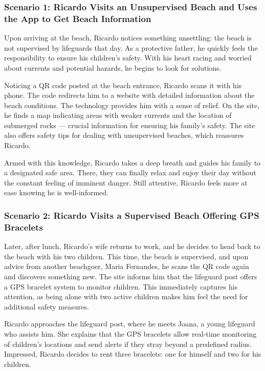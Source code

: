 \subsubsection{\textbf{Scenario 1:} Ricardo Visits an Unsupervised Beach and Uses the App to Get Beach Information}
Upon arriving at the beach, Ricardo notices something unsettling: the beach is not supervised by lifeguards that day. As a protective father, he quickly feels the responsibility to ensure his children’s safety. With his heart racing and worried about currents and potential hazards, he begins to look for solutions.

Noticing a QR code posted at the beach entrance, Ricardo scans it with his phone. The code redirects him to a website with detailed information about the beach conditions. The technology provides him with a sense of relief. On the site, he finds a map indicating areas with weaker currents and the location of submerged rocks — crucial information for ensuring his family’s safety. The site also offers safety tips for dealing with unsupervised beaches, which reassures Ricardo.

Armed with this knowledge, Ricardo takes a deep breath and guides his family to a designated safe area. There, they can finally relax and enjoy their day without the constant feeling of imminent danger. Still attentive, Ricardo feels more at ease knowing he is well-informed.

\subsubsection{\textbf{Scenario 2:} Ricardo Visits a Supervised Beach Offering GPS Bracelets}
Later, after lunch, Ricardo’s wife returns to work, and he decides to head back to the beach with his two children. This time, the beach is supervised, and upon advice from another beachgoer, Maria Fernandes, he scans the QR code again and discovers something new. The site informs him that the lifeguard post offers a GPS bracelet system to monitor children. This immediately captures his attention, as being alone with two active children makes him feel the need for additional safety measures.

Ricardo approaches the lifeguard post, where he meets Joana, a young lifeguard who assists him. She explains that the GPS bracelets allow real-time monitoring of children’s locations and send alerts if they stray beyond a predefined radius. Impressed, Ricardo decides to rent three bracelets: one for himself and two for his children.

